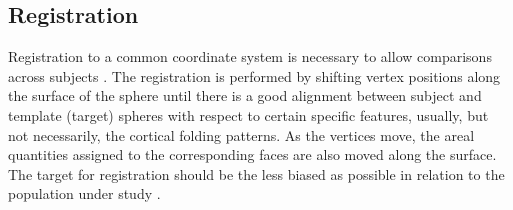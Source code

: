 %
%
%

\subsection{Registration}

Registration to a common coordinate system is necessary to allow comparisons across subjects \citep{Drury1996}. The registration is performed by shifting vertex positions along the surface of the sphere until there is a good alignment between subject and template (target) spheres with respect to certain specific features, usually, but not necessarily, the cortical folding patterns. As the vertices move, the areal quantities assigned to the corresponding faces are also moved along the surface. The target for registration should be the less biased as possible in relation to the population under study \citep{Thompson2002}.

